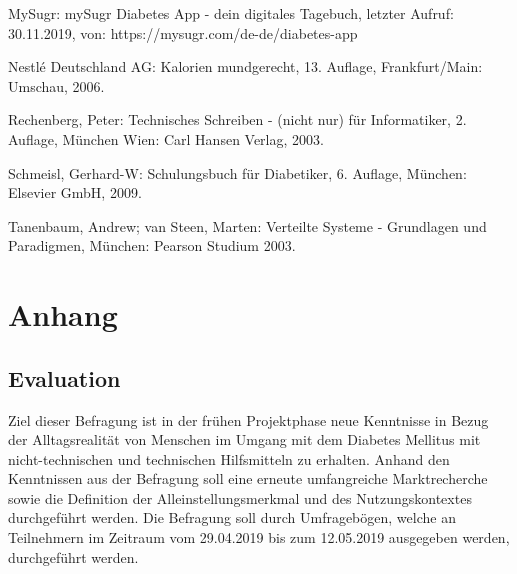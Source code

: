 \documentclass[a4paper,11pt]{article}%
\renewcommand{\\}{\vspace*{0.5\baselineskip} \newline}
\begin{document}
\begin{thebibliography}{1}
	MySugr:
	mySugr Diabetes App - dein digitales Tagebuch, letzter Aufruf: 30.11.2019, von:	
	https://mysugr.com/de-de/diabetes-app
	
	Nestlé Deutschland AG: 
	Kalorien mundgerecht, 13. Auflage, Frankfurt/Main: Umschau,
	2006.
	
	Rechenberg, Peter: 
	Technisches Schreiben - (nicht nur) für Informatiker, 2. Auflage,
	München Wien: Carl Hansen Verlag,
	2003.
	
	Schmeisl, Gerhard-W: 
	Schulungsbuch für Diabetiker, 6. Auflage, 
	München: Elsevier GmbH,
	2009.
	
	Tanenbaum, Andrew; van Steen, Marten: 
	Verteilte Systeme - Grundlagen und Paradigmen,
	München: Pearson Studium
	2003.
		
\end{thebibliography}
\newpage
\appendix
\section*{Anhang}
\renewcommand{\thesubsection}{\Alph{subsection}}
\subsection{Evaluation}
\label{section:Evaluation}
	Ziel dieser Befragung ist in der frühen Projektphase neue Kenntnisse in Bezug der Alltagsrealität von Menschen im Umgang mit dem Diabetes Mellitus mit nicht-technischen und technischen Hilfsmitteln zu erhalten.\newline
	Anhand den Kenntnissen aus der Befragung soll eine erneute umfangreiche Marktrecherche sowie die Definition der Alleinstellungsmerkmal und des Nutzungskontextes durchgeführt werden. Die Befragung soll durch Umfragebögen, welche an Teilnehmern im Zeitraum vom 29.04.2019 bis zum 12.05.2019 ausgegeben werden, durchgeführt werden. 
\end{document}

